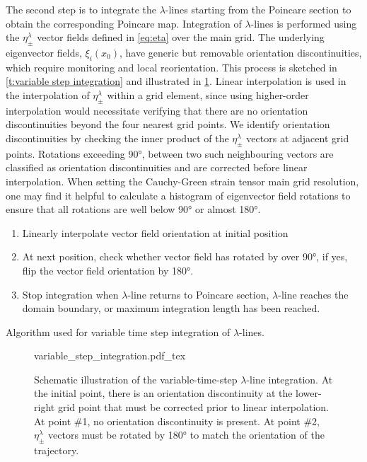\documentclass{article}
\begin{document}
The second step is to integrate the $\lambda$-lines  starting from the Poincare section to obtain the corresponding Poincare map. Integration of $\lambda$-lines is performed using the $\eta_\pm^\lambda$ vector fields defined in \cref{eq:eta} over the main grid. The underlying eigenvector fields, $\xi_i(x_0)$, have generic but removable orientation discontinuities, which require monitoring and local reorientation. This process is sketched in \cref{t:variable step integration} and illustrated in \cref{f:variable step integration}. Linear interpolation is used in the interpolation of $\eta_\pm^\lambda$ within a grid element, since using higher-order interpolation would necessitate verifying that there are no orientation discontinuities beyond the four nearest grid points. We identify orientation discontinuities by checking the inner product of the $\eta_\pm^\lambda$ vectors at adjacent grid points. Rotations exceeding 90°, between two such neighbouring vectors are classified as orientation discontinuities and are corrected before linear interpolation. When setting the Cauchy-Green strain tensor main grid resolution, one may find it helpful to calculate a histogram of eigenvector field rotations to ensure that all rotations are well below 90° or almost 180°.

\begin{table}
\begin{enumerate}
\item Linearly interpolate vector field orientation at initial position
\item At next position, check whether vector field has rotated by over 90°, if yes, flip the vector field orientation by 180°.
\item Stop integration when $\lambda$-line returns to Poincare section, $\lambda$-line reaches the domain boundary, or maximum integration length has been reached.
\end{enumerate}
\caption{Algorithm used for variable time step integration of $\lambda$-lines.}
\label{t:variable step integration}
\end{table}

\begin{figure}
\begin{center}
\def\svgwidth{.75\textwidth}
{variable_step_integration.pdf_tex}
\end{center}
\caption{Schematic illustration of the variable-time-step $\lambda$-line integration.
At the initial point, there is an orientation discontinuity at the lower-right grid point that must be corrected prior to linear interpolation.
At point \#1, no orientation discontinuity is present.
At point \#2, $\eta_\pm^\lambda$ vectors must be rotated by 180° to match the orientation of the trajectory.}
\label{f:variable step integration}
\end{figure}
\end{document}
